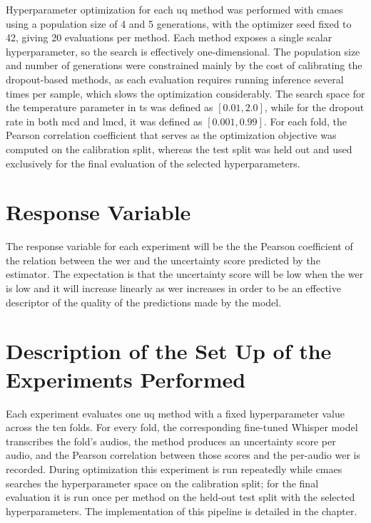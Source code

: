 Hyperparameter optimization for each \acrshort{uq} method was performed with \acrshort{cmaes} using a population size of 4 and 5 generations, with the optimizer seed fixed to 42, giving 20 evaluations per method. Each method exposes a single scalar hyperparameter, so the search is effectively one-dimensional. The population size and number of generations were constrained mainly by the cost of calibrating the dropout-based methods, as each evaluation requires running inference several times per sample, which slows the optimization considerably.
The search space for the temperature parameter in \acrshort{ts} was defined as $[0.01, 2.0]$, while for the dropout rate in both \acrshort{mcd} and \acrshort{lmcd}, it was defined as $[0.001, 0.99]$.
For each fold, the Pearson correlation coefficient that serves as the optimization objective was computed on the calibration split, whereas the test split was held out and used exclusively for the final evaluation of the selected hyperparameters.






\section{Response Variable}
The response variable for each experiment will be the the Pearson coefficient of the relation between the \acrshort{wer} and the uncertainty score predicted by the estimator.
The expectation is that the uncertainty score will be low when the \acrshort{wer} is low and it will increase linearly as \acrshort{wer} increases in order to be an effective descriptor of the quality of the predictions made by the model.

\section{Description of the Set Up of the Experiments Performed}
Each experiment evaluates one \acrshort{uq} method with a fixed hyperparameter value across the ten folds. For every fold, the corresponding fine-tuned Whisper model transcribes the fold's audios, the method produces an uncertainty score per audio, and the Pearson correlation between those scores and the per-audio \acrshort{wer} is recorded. During optimization this experiment is run repeatedly while \acrshort{cmaes} searches the hyperparameter space on the calibration split; for the final evaluation it is run once per method on the held-out test split with the selected hyperparameters. The implementation of this pipeline is detailed in the  chapter.

